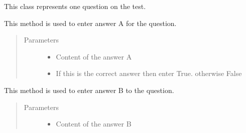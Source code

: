 \documentclass[letterpaper,10pt,english]{sphinxmanual}
\begin{document}
\begin{fulllineitems}
\label{\detokenize{index:pytexexam.question.Question}}
This class represents one question on the test.

\begin{fulllineitems}
\label{\detokenize{index:pytexexam.question.Question.answer_a}}
This method is used to enter answer A for the question.
\begin{quote}\begin{description}
\item[{Parameters}] \leavevmode\begin{itemize}
\item {} 
 \textendash{} Content of the answer A

\item {} 
 \textendash{} If this is the correct answer then enter True. otherwise False

\end{itemize}

\end{description}\end{quote}

\end{fulllineitems}


\begin{fulllineitems}
\label{\detokenize{index:pytexexam.question.Question.answer_b}}
This method is used to enter answer B to the question.
\begin{quote}\begin{description}
\item[{Parameters}] \leavevmode\begin{itemize}
\item {} 
 \textendash{} Content of the answer B


\end{itemize}
\end{description}
\end{quote}
\end{fulllineitems}
\end{fulllineitems}
\end{document}
